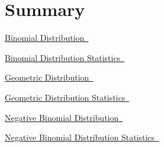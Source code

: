 \documentclass[10pt,]{book}
\numberwithin{equation}{section}
\begin{document}
\section[{Summary}]{Summary}\label{section-49}
\hypertarget{p-1007}{}%
\hyperlink{BinomialProbabilityFunction}{Binomial Distribution~}%
\par
\hypertarget{p-1008}{}%
\hyperlink{BinomialStatistics}{Binomial Distribution Statistics~}%
\par
\hypertarget{p-1009}{}%
\hyperlink{GeometricProbabilityFunction}{Geometric Distribution~}%
\par
\hypertarget{p-1010}{}%
\hyperlink{GeometricStatistics}{Geometric Distribution Statistics~}%
\par
\hypertarget{p-1011}{}%
\hyperlink{NegativeBinomialProbabilityFunction}{Negative Binomial Distribution~}%
\par
\hypertarget{p-1012}{}%
\hyperlink{NegativeBinomialStatistics}{Negative Binomial Distribution Statistics~}%
%
%
\typeout{************************************************}
\typeout{************************************************}
%
\end{document}
